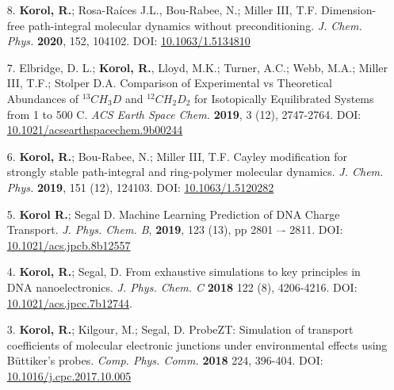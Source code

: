\documentclass[11pt]{res}
\begin{document}
\begin{resume}


\begin{enumerate}
	\item[8.] \textbf{Korol, R.}; Rosa-Ra\'ices J.L., Bou-Rabee,  N.; Miller III, T.F. Dimension-free path-integral molecular dynamics without preconditioning. \textit{J. Chem. Phys.} \textbf{2020}, 152, 104102. DOI: \href{https://aip.scitation.org/doi/abs/10.1063/1.5134810}{10.1063/1.5134810}

	\item[7.] Elbridge, D. L.; \textbf{Korol, R.}, Lloyd, M.K.; Turner, A.C.; Webb, M.A.; Miller III, T.F.; Stolper D.A.
Comparison of Experimental vs Theoretical Abundances of $^{13}CH_3D$ and $^{12}CH_2D_2$ for Isotopically Equilibrated Systems from 1 to 500 \degree C. \textit{ACS Earth Space Chem.} \textbf{2019}, 3 (12), 2747-2764. DOI: \href{https://pubs.acs.org/doi/10.1021/acsearthspacechem.9b00244}{10.1021/acsearthspacechem.9b00244}


	\item[6.] \textbf{Korol, R.}; Bou-Rabee,  N.; Miller III, T.F. Cayley modification for strongly stable path-integral and ring-polymer molecular dynamics. \textit{J. Chem. Phys.} \textbf{2019}, 151 (12), 124103. DOI: \href{https://aip.scitation.org/doi/10.1063/1.5120282}{10.1063/1.5120282}

	\item[5.] \textbf{Korol R.}; Segal D. Machine Learning Prediction of DNA Charge Transport. \textit{J. Phys. Chem. B}, \textbf{2019}, 123 (13), pp 2801 –- 2811. DOI: \href{https://pubs.acs.org/doi/full/10.1021/acs.jpcb.8b12557}{10.1021/acs.jpcb.8b12557}
	
	\item[4.] \textbf{Korol, R.}; Segal, D. From exhaustive simulations to key principles in DNA nanoelectronics. \textit{J. Phys. Chem. C} \textbf{2018} 122 (8), 4206-4216. DOI: \href{https://pubs.acs.org/doi/abs/10.1021/acs.jpcc.7b12744}{10.1021/acs.jpcc.7b12744}.

	\item[3.] \textbf{Korol, R.}; Kilgour,  M.; Segal, D. ProbeZT: Simulation of transport coefficients of molecular electronic junctions under environmental effects using B\"uttiker’s probes. \textit{Comp. Phys. Comm.} \textbf{2018} 224, 396-404. DOI: \href{https://doi.org/10.1016/j.cpc.2017.10.005}{10.1016/j.cpc.2017.10.005}


\end{enumerate}
\end{resume}
\end{document}
